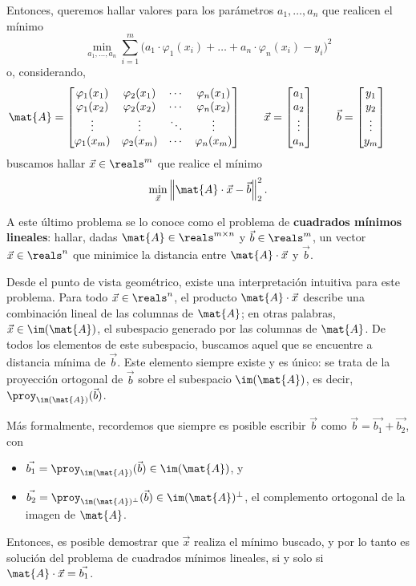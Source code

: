 Entonces, queremos hallar valores para los parámetros $a_1, \dots, a_n$ que
realicen el mínimo
\[ \min_{a_1,\dots,a_n} \sum_{i=1}^{m} \big( a_1 \cdot \varphi_1(x_i)
    + \dots + a_n \cdot \varphi_n(x_i) - y_i \big)^2 \]
o, considerando,
\[ \mat{A} = \begin{bmatrix}
    \varphi_1(x_1) & \varphi_2(x_1) & \cdots & \varphi_n(x_1) \\
    \varphi_1(x_2) & \varphi_2(x_2) & \cdots & \varphi_n(x_2) \\
    \vdots         & \vdots         & \ddots & \vdots \\
    \varphi_1(x_m) & \varphi_2(x_m) & \cdots & \varphi_n(x_m) 
\end{bmatrix} \qquad
\vec{x} = \begin{bmatrix}
    a_1 \\ a_2 \\ \vdots \\ a_n
\end{bmatrix} \qquad
\vec{b} = \begin{bmatrix}
    y_1 \\ y_2 \\ \vdots \\ y_m
\end{bmatrix} \qquad \]
buscamos hallar $\vec{x} \in \reals^m$ que realice el mínimo
\[ \min_{\vec{x}} \left\Vert \mat{A} \cdot \vec{x} - \vec{b} \right\Vert_2^2. \]

A este último problema se lo conoce como el problema de \textbf{cuadrados
mínimos lineales}: hallar, dadas $\mat{A} \in \reals^{m \times n}$ y $\vec{b}
\in \reals^m$, un vector $\vec{x} \in \reals^n$ que minimice la distancia
entre $\mat{A} \cdot \vec{x}$ y $\vec{b}$.

Desde el punto de vista geométrico, existe una interpretación intuitiva para
este problema. Para todo $\vec{x} \in \reals^n$, el producto $\mat{A}
\cdot \vec{x}$ describe una combinación lineal de las columnas de $\mat{A}$;
en otras palabras, $\vec{x} \in \im(\mat{A})$, el subespacio generado por las
columnas de $\mat{A}$. De todos los elementos de este subespacio, buscamos
aquel que se encuentre a distancia mínima de $\vec{b}$. Este elemento siempre
existe y es único: se trata de la proyección ortogonal de $\vec{b}$ sobre el
subespacio $\im(\mat{A})$, es decir, $\proy_{\im(\mat{A})}(\vec{b})$.

Más formalmente, recordemos que siempre es posible escribir $\vec{b}$ como
$\vec{b} = \vec{b_1} + \vec{b_2}$, con
\begin{itemize}
\item $\vec{b_1} = \proy_{\im(\mat{A})}(\vec{b}) \in \im(\mat{A})$, y
\item $\vec{b_2} = \proy_{\im(\mat{A})^{\bot}}(\vec{b}) \in
    \im(\mat{A})^{\bot}$, el complemento ortogonal de la imagen de $\mat{A}$.
\end{itemize}
Entonces, es posible demostrar que $\vec{x}$ realiza el mínimo buscado,
y por lo tanto es solución del problema de cuadrados mínimos lineales,
si y solo si $\mat{A} \cdot \vec{x} = \vec{b_1}$.

